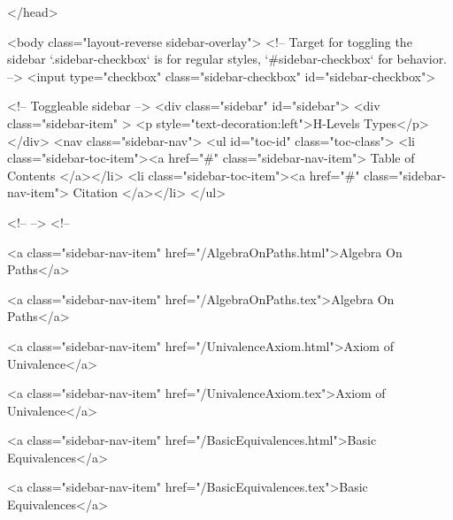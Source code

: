   
</head>




  <body class="layout-reverse sidebar-overlay">
    <!-- Target for toggling the sidebar `.sidebar-checkbox` is for regular
     styles, `#sidebar-checkbox` for behavior. -->
<input type="checkbox" class="sidebar-checkbox" id="sidebar-checkbox">

<!-- Toggleable sidebar -->
<div class="sidebar" id="sidebar">
  <div class="sidebar-item" >
    <p style="text-decoration:left">H-Levels Types</p>
  </div>
  <nav class="sidebar-nav">
    <ul id="toc-id" class="toc-class">
  <li class="sidebar-toc-item"><a href="#" class="sidebar-nav-item"> Table of Contents </a></li>
  <li class="sidebar-toc-item"><a href="#" class="sidebar-nav-item"> Citation </a></li>
</ul>


    <!--  -->
    <!-- 
      
    
      
    
      
    
      
    
      
        
      
    
      
        
          <a class="sidebar-nav-item" href="/AlgebraOnPaths.html">Algebra On Paths</a>
        
      
    
      
        
          <a class="sidebar-nav-item" href="/AlgebraOnPaths.tex">Algebra On Paths</a>
        
      
    
      
        
          <a class="sidebar-nav-item" href="/UnivalenceAxiom.html">Axiom of Univalence</a>
        
      
    
      
        
          <a class="sidebar-nav-item" href="/UnivalenceAxiom.tex">Axiom of Univalence</a>
        
      
    
      
        
          <a class="sidebar-nav-item" href="/BasicEquivalences.html">Basic Equivalences</a>
        
      
    
      
        
          <a class="sidebar-nav-item" href="/BasicEquivalences.tex">Basic Equivalences</a>
        
